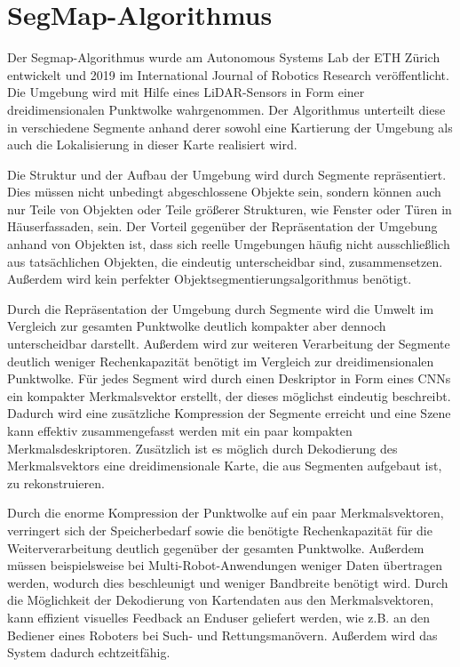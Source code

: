 \chapter[SegMap-Algorithmus (Schmelzer)]{SegMap-Algorithmus}
\label{sec:SegMap}

Der Segmap-Algorithmus wurde am Autonomous Systems Lab der ETH Zürich ent\-wick\-elt und 2019 im International Journal of Robotics Research veröffentlicht. Die Umgebung wird mit Hilfe eines LiDAR-Sensors in Form einer dreidimensionalen Punkt\-wol\-ke wahrgenommen. Der Algorithmus unterteilt diese in verschiedene Segmente anhand derer sowohl eine Kartierung der Umgebung als auch die Lokalisierung in dieser Karte realisiert wird.

Die Struktur und der Aufbau der Umgebung wird durch Segmente repräsentiert. Dies müssen nicht unbedingt abgeschlossene Objekte sein, sondern können auch nur Teile von Objekten oder Teile größerer Strukturen, wie Fenster oder Türen in Häuserfassaden, sein. Der Vorteil gegenüber der Repräsentation der Umgebung anhand von Objekten ist, dass sich reelle Umgebungen häufig nicht ausschließlich aus tatsächlichen Objekten, die eindeutig unterscheidbar sind, zusammensetzen. Außerdem wird kein perfekter Objektsegmentierungsalgorithmus benötigt. 

Durch die Repräsentation der Umgebung durch Segmente wird die Umwelt im Vergleich zur gesamten Punktwolke deutlich kompakter aber dennoch unterscheidbar darstellt. Außerdem wird zur weiteren Verarbeitung der Segmente deutlich weniger Rechenkapazität benötigt im Vergleich zur dreidimensionalen Punktwolke. Für jedes Segment wird durch einen Deskriptor in Form eines CNNs ein kompakter Merkmalsvektor erstellt, der dieses möglichst eindeutig beschreibt. Dadurch wird eine zusätzliche Kompression der Segmente erreicht und eine Szene kann effektiv zusammengefasst werden mit ein paar kompakten Merkmalsdeskriptoren. Zusätzlich ist es möglich durch Dekodierung des Merkmalsvektors eine dreidimensionale Karte, die aus Segmenten aufgebaut ist, zu rekonstruieren. 

Durch die enorme Kompression der Punktwolke auf ein paar Merkmalsvektoren, verringert sich der Speicherbedarf sowie die benötigte Rechenkapazität für die Weiterverarbeitung deutlich gegenüber der gesamten Punktwolke. Außerdem müssen bei\-spiels\-wei\-se bei Multi-Robot-Anwendungen weniger Daten übertragen werden, wodurch dies beschleunigt und weniger Bandbreite benötigt wird. Durch die Möglichkeit der Dekodierung von Kartendaten aus den Merkmalsvektoren, kann effizient visuelles Feedback an Enduser geliefert werden, wie z.B. an den Bediener eines Roboters bei Such- und Rettungsmanövern. Außerdem wird das System dadurch echtzeitfähig. 

